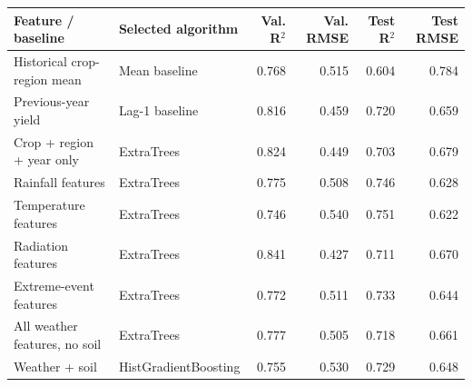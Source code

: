 \begin{tabularx}{\textwidth}{Ylrrrr}
\toprule
Feature / baseline & Selected algorithm & Val. R$^2$ & Val. RMSE & Test R$^2$ & Test RMSE \\
\midrule
Historical crop-region mean & Mean baseline & 0.768 & 0.515 & 0.604 & 0.784 \\
Previous-year yield & Lag-1 baseline & 0.816 & 0.459 & 0.720 & 0.659 \\
Crop + region + year only & ExtraTrees & 0.824 & 0.449 & 0.703 & 0.679 \\
Rainfall features & ExtraTrees & 0.775 & 0.508 & 0.746 & 0.628 \\
Temperature features & ExtraTrees & 0.746 & 0.540 & 0.751 & 0.622 \\
Radiation features & ExtraTrees & 0.841 & 0.427 & 0.711 & 0.670 \\
Extreme-event features & ExtraTrees & 0.772 & 0.511 & 0.733 & 0.644 \\
All weather features, no soil & ExtraTrees & 0.777 & 0.505 & 0.718 & 0.661 \\
Weather + soil & HistGradientBoosting & 0.755 & 0.530 & 0.729 & 0.648 \\
\bottomrule
\end{tabularx}
